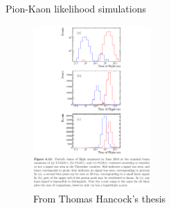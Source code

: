 \documentclass{beamer}
\begin{document}
\begin{frame}{Pion-Kaon likelihood simulations}
  \begin{figure}
    \centering
    \includegraphics[width = 0.4\textwidth]{Plots/ThomasHanchockThesisP128.png}
    \caption{From Thomas Hancock's thesis}
  \end{figure}
\end{frame}
\end{document}
